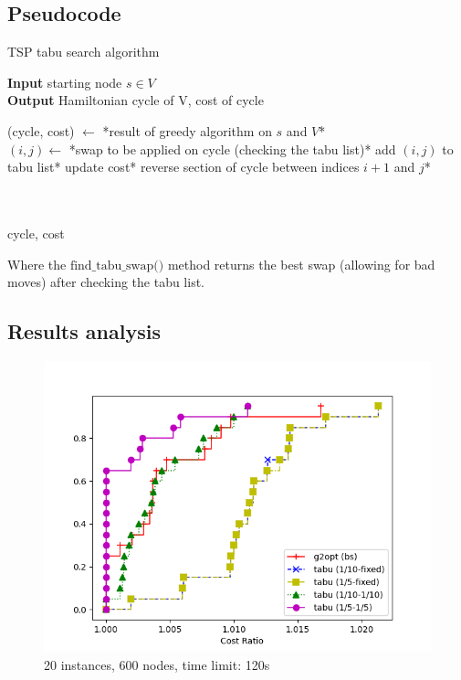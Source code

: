 \subsection{Pseudocode}

\begin{algorithm}
    \caption{TSP tabu search algorithm}
    
    \textbf{Input} starting node $s\in V$\\
    \textbf{Output} Hamiltonian cycle of V, cost of cycle\\
    \begin{algorithmic}
        
        \State (cycle, cost) $\gets$ *result of greedy algorithm on $s$ and $V$*\\

            \State $(i, j)\gets$ *swap to be applied on cycle (checking the tabu list)*
                \State *add $(i,j)$ to tabu list*
            \EndIf
            \State *update cost*
            \State *reverse section of cycle between indices $i+1$ and $j$*

        \EndWhile\\\\

        \Return cycle, cost
    \end{algorithmic}
\end{algorithm}

Where the $\mbox{find\_tabu\_swap()}$ method returns the best swap (allowing for bad moves) after checking the tabu list.

\subsection{Results analysis}

\begin{figure}[h]
    \centering
    \includegraphics*[width=.6\textwidth]{../plots/perfprof_tabu_costs.png}
    \caption*{20 instances, 600 nodes, time limit: 120s}
\end{figure}
\FloatBarrier

